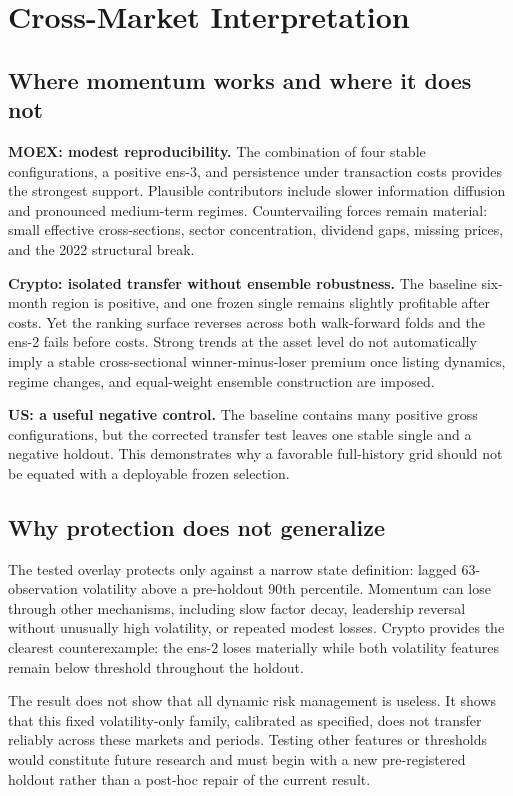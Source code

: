 \documentclass[11pt,a4paper]{article}
\begin{document}
\section{Cross-Market Interpretation}

\subsection{Where momentum works and where it does not}

\textbf{MOEX: modest reproducibility.} The combination of four stable configurations, a positive ens-3, and persistence under transaction costs provides the strongest support. Plausible contributors include slower information diffusion and pronounced medium-term regimes. Countervailing forces remain material: small effective cross-sections, sector concentration, dividend gaps, missing prices, and the 2022 structural break.

\textbf{Crypto: isolated transfer without ensemble robustness.} The baseline six-month region is positive, and one frozen single remains slightly profitable after costs. Yet the ranking surface reverses across both walk-forward folds and the ens-2 fails before costs. Strong trends at the asset level do not automatically imply a stable cross-sectional winner-minus-loser premium once listing dynamics, regime changes, and equal-weight ensemble construction are imposed.

\textbf{US: a useful negative control.} The baseline contains many positive gross configurations, but the corrected transfer test leaves one stable single and a negative holdout. This demonstrates why a favorable full-history grid should not be equated with a deployable frozen selection.

\subsection{Why protection does not generalize}

The tested overlay protects only against a narrow state definition: lagged 63-observation volatility above a pre-holdout 90th percentile. Momentum can lose through other mechanisms, including slow factor decay, leadership reversal without unusually high volatility, or repeated modest losses. Crypto provides the clearest counterexample: the ens-2 loses materially while both volatility features remain below threshold throughout the holdout.

The result does not show that all dynamic risk management is useless. It shows that this fixed volatility-only family, calibrated as specified, does not transfer reliably across these markets and periods. Testing other features or thresholds would constitute future research and must begin with a new pre-registered holdout rather than a post-hoc repair of the current result.
\end{document}
